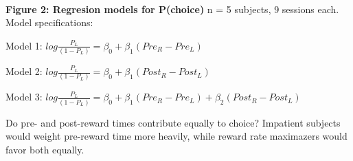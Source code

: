 \documentclass[11pt]{article}
\begin{document}
    \begin{center}
    \end{center}
    { \hspace*{\fill} \\}
    
    \textbf{Figure 2: Regresion models for P(choice)} n = 5 subjects, 9
sessions each. Model specifications:

Model 1: \(log{\frac{P_L}{(1-P_L)}} = \beta_0 + \beta_1(Pre_R - Pre_L)\)

Model 2:
\(log{\frac{P_L}{(1-P_L)}} = \beta_0 + \beta_1(Post_R - Post_L)\)

Model 3:
\(log{\frac{P_L}{(1-P_L)}} = \beta_0 + \beta_1(Pre_R - Pre_L) + \beta_2(Post_R - Post_L)\)

    Do pre- and post-reward times contribute equally to choice? Impatient
subjects would weight pre-reward time more heavily, while reward rate
maximazers would favor both equally.
\end{document}
